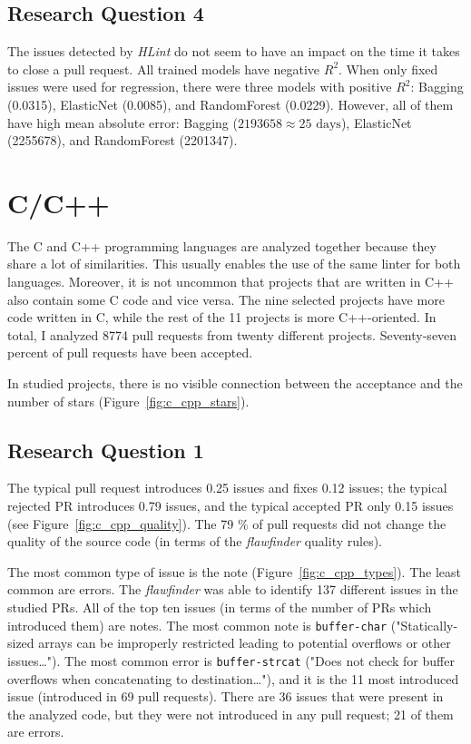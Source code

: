 \documentclass[digital,oneside,oldtable,nolof,nolot,nocover]{fithesis4}
\begin{document}
\subsection{Research Question 4}
\label{sec:org9dd09e0}
The issues detected by \emph{HLint} do not seem to have an impact on the time it takes to close a pull request.
All trained models have negative \(R^2\). When only fixed issues were used for regression, there
were three models with positive \(R^2\): Bagging (0.0315), ElasticNet (0.0085), and RandomForest (0.0229).
However, all of them have high mean absolute error: Bagging (\(2193658 \approx 25\text{ days}\)),
ElasticNet (2255678), and RandomForest (2201347).
\FloatBarrier
\section{C/C++}
\label{sec:orgf3f0e9d}
The C and C++ programming languages are analyzed together because they share
a lot of similarities.  This usually enables the use of the same linter for both
languages. Moreover, it is not uncommon that projects that are written in C++
also contain some C code and vice versa.
The nine selected projects have more code written in C, while the rest of the
11 projects is more C++-oriented. In total, I analyzed 8774 pull requests
from twenty different projects. Seventy-seven percent of pull requests have been accepted.

In studied projects, there is no visible connection between the acceptance
and the number of stars (Figure~\ref{fig:c_cpp_stars}).
\subsection{Research Question 1}
\label{sec:org2c93351}
The typical pull request introduces 0.25 issues and fixes 0.12 issues; the typical
rejected PR introduces 0.79 issues, and the typical accepted PR only 0.15 issues (see Figure~\ref{fig:c_cpp_quality}).
The 79 \% of pull requests did not change the quality of the source code
(in terms of the \emph{flawfinder} quality rules).

The most common type of issue is the note (Figure~\ref{fig:c_cpp_types}).
The least common are errors. The \emph{flawfinder} was able to identify 137 different issues in the studied
PRs. All of the top ten issues (in terms of the number of PRs which introduced
them) are notes. The most common note is \texttt{buffer-char} ("Statically-sized
arrays can be improperly restricted leading to potential overflows or other
issues\dots{}"). The most common error is \texttt{buffer-strcat} ("Does not check
for buffer overflows when concatenating to destination\dots{}"), and it is the
11 most introduced issue (introduced in 69 pull requests). There are 36 issues
that were present in the analyzed code, but they were not introduced in any
pull request; 21 of them are errors.
\end{document}
